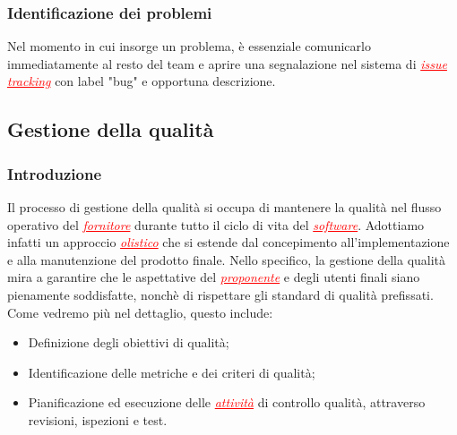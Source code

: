 \subsubsection{Identificazione dei problemi}
Nel momento in cui insorge un problema, è essenziale comunicarlo immediatamente al resto del team e aprire una segnalazione nel sistema di
\textcolor{red}{\uline{\textit{issue tracking}}} con label "bug" e opportuna descrizione.

\subsection{Gestione della qualità}
\subsubsection{Introduzione}
Il processo di gestione della qualità si occupa di mantenere la qualità nel flusso operativo del \textcolor{red}{\uline{\textit{fornitore}}}
durante tutto il ciclo di vita del \textcolor{red}{\uline{\textit{software}}}. Adottiamo infatti un approccio 
\textcolor{red}{\uline{\textit{olistico}}} che si estende dal concepimento all'implementazione e alla manutenzione del prodotto finale.
Nello specifico, la gestione della qualità mira a garantire che le aspettative del \textcolor{red}{\uline{\textit{proponente}}} e 
degli utenti finali siano pienamente soddisfatte, nonchè di rispettare gli standard di qualità prefissati. Come vedremo più nel dettaglio,
questo include:
\begin{itemize}
    \item Definizione degli obiettivi di qualità;
    \item Identificazione delle metriche e dei criteri di qualità;
    \item Pianificazione ed esecuzione delle \textcolor{red}{\uline{\textit{attività}}} di controllo qualità, attraverso revisioni, ispezioni e test.
\end{itemize}

